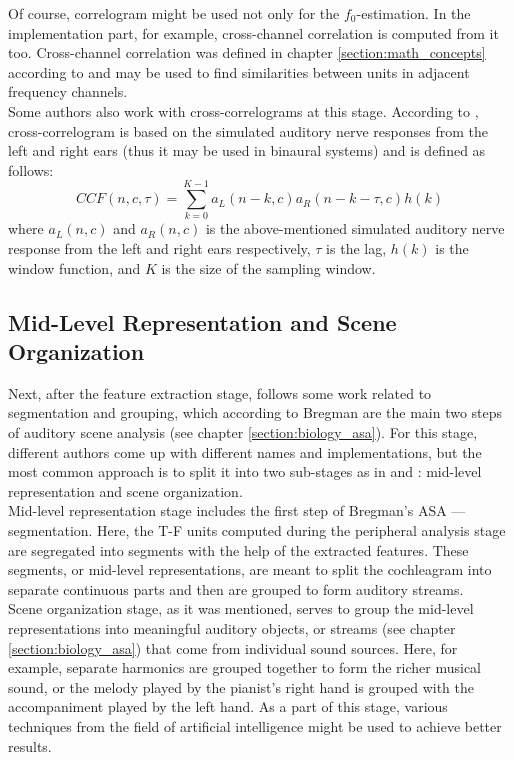 Of course, correlogram might be used not only for the $f_0$-estimation. In the implementation part, for example, cross-channel correlation is computed from it too. Cross-channel correlation was defined in chapter \ref{section:math_concepts} according to \cite{Wang2012} and may be used to find similarities between units in adjacent frequency channels.\\

Some authors also work with cross-correlograms at this stage. According to \cite{Wang2006}, cross-correlogram is based on the simulated auditory nerve responses from the left and right ears (thus it may be used in binaural systems) and is defined as follows:
\begin{equation}
	CCF(n, c, \tau) = \sum_{k=0}^{K-1} a_L(n-k, c) a_R(n-k-\tau, c) h(k)
\end{equation}
where $a_L(n, c)$ and $a_R(n, c)$ is the above-mentioned simulated auditory nerve response from the left and right ears respectively, $\tau$ is the lag, $h(k)$ is the window function, and $K$ is the size of the sampling window.

\subsection{Mid-Level Representation and Scene Organization}\label{subsection:casa_segmentation_and_grouping}

Next, after the feature extraction stage, follows some work related to segmentation and grouping, which according to Bregman are the main two steps of auditory scene analysis (see chapter \ref{section:biology_asa}). For this stage, different authors come up with different names and implementations, but the most common approach is to split it into two sub-stages as in \cite{Wang2006} and \cite{Jasti2020}: mid-level representation and scene organization.\\

Mid-level representation stage includes the first step of Bregman's ASA --- segmentation. Here, the T-F units computed during the peripheral analysis stage are segregated into segments with the help of the extracted features. These segments, or mid-level representations, are meant to split the cochleagram into separate continuous parts and then are grouped to form auditory streams.\\

Scene organization stage, as it was mentioned, serves to group the mid-level representations into meaningful auditory objects, or streams (see chapter \ref{section:biology_asa}) that come from individual sound sources. Here, for example, separate harmonics are grouped together to form the richer musical sound, or the melody played by the pianist's right hand is grouped with the accompaniment played by the left hand. As a part of this stage, various techniques from the field of artificial intelligence might be used to achieve better results.\\

